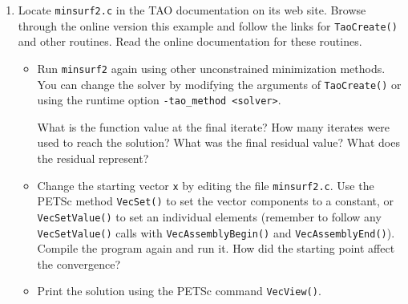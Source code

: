\documentclass[11pt]{article}
\begin{document}
\begin{enumerate}
\item
  Locate \texttt{minsurf2.c} in the TAO documentation on its web site.  Browse through
  the online version this example and follow the links for
  \texttt{TaoCreate()} and other routines.  Read the online documentation for these routines.

\begin{itemize}
  \item
  Run \texttt{minsurf2} again using other unconstrained minimization
  methods.    You can change the solver by modifying the arguments of
  \texttt{TaoCreate()} or using the runtime option \texttt{-tao\_method <solver>}.

  What is the function value at the final iterate?
  How many iterates were used to reach
  the solution?  What was the final residual value? What does the residual represent?

 \item
  Change the starting vector \texttt{x} by editing the file \texttt{minsurf2.c}.
  Use the PETSc method {\tt VecSet()}
  to set the vector components to a constant, or {\tt VecSetValue()} to set
  an individual elements (remember to follow any {\tt VecSetValue()} calls
  with {\tt VecAssemblyBegin()} and {\tt VecAssemblyEnd()}).  Compile the program again and run it.
  How did the starting point affect the convergence?

 \item Print the solution using the PETSc command {\tt VecView()}.
\end{itemize}

\end{enumerate}
\end{document}
